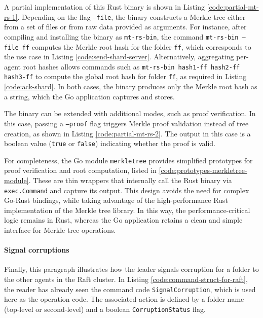 A partial implementation of this Rust binary is shown in Listing
\ref{code:partial-mt-rs-1}. Depending on the flag \texttt{--file}, the binary constructs a 
Merkle tree either from a set of files or from raw data provided as arguments. For instance, 
after compiling and installing the binary as \texttt{mt-rs-bin}, the command 
\texttt{mt-rs-bin --file ff} computes the Merkle root hash for the folder \texttt{ff}, 
which corresponds to the use case in Listing \ref{code:send-shard-server}. Alternatively, 
aggregating per-agent root hashes allows commands such as 
\texttt{mt-rs-bin hash1-ff hash2-ff hash3-ff} to compute the global root hash for folder 
\texttt{ff}, as required in Listing \ref{code:ack-shard}. In both cases, the binary 
produces only the Merkle root hash as a string, which the Go application captures and stores.  

The binary can be extended with additional modes, such as proof verification. 
In this case, passing a \texttt{--proof} flag triggers Merkle proof validation instead of 
tree creation, as shown in Listing \ref{code:partial-mt-rs-2}. The output in this case is 
a boolean value (\texttt{true} or \texttt{false}) indicating whether the proof is valid.  

For completeness, the Go module \texttt{merkletree} provides simplified prototypes for 
proof verification and root computation, listed in \ref{code:prototypes-merkletree-module}. 
These are thin wrappers that internally call the Rust binary via 
\texttt{exec.Command} and capture its output. This design avoids the need for 
complex Go-Rust bindings, while taking advantage of the high-performance Rust 
implementation of the Merkle tree library. In this way, the performance-critical 
logic remains in Rust, whereas the Go application retains a clean and simple 
interface for Merkle tree operations.  

\paragraph{Signal corruptions}

Finally, this paragraph illustrates how the leader signals corruption for a folder
to the other agents in the Raft cluster. In Listing
\ref{code:command-struct-for-raft}, the reader has already seen the command code
\texttt{SignalCorruption}, which is used here as the operation code. The
associated action is defined by a folder name (top-level or second-level) and a
boolean \texttt{CorruptionStatus} flag.

